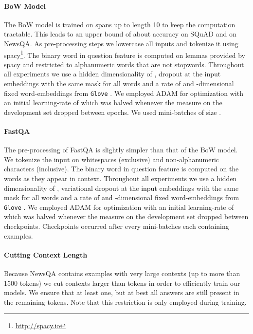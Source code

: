 \documentclass[11pt,a4paper]{article}
\begin{document}
\paragraph{BoW Model}

The BoW model is trained on spans up to length 10 to keep the computation tractable. This leads to an upper bound of about  accuracy on SQuAD and  on NewsQA. As pre-processing steps we lowercase all inputs and tokenize it using spacy\footnote{\url{http://spacy.io}}. The binary word in question feature is computed on lemmas provided by spacy and restricted to alphanumeric words that are not stopwords.
Throughout all experiments we use a hidden dimensionality of , dropout at the input embeddings with the same mask for all words \cite{Gal2015} and a rate of  and -dimensional fixed word-embeddings from \verb|Glove| \cite{Pennington2014}. We employed ADAM \cite{Kingma2015} for optimization with an initial learning-rate of  which was halved whenever the  measure on the development set dropped between epochs. We used mini-batches of size .

\paragraph{FastQA}

The pre-processing of FastQA is slightly simpler than that of the BoW model. We tokenize the input on whitespaces (exclusive) and non-alphanumeric characters (inclusive). The binary word in question feature is computed on the words as they appear in context.
Throughout all experiments we use a hidden dimensionality of , variational dropout at the input embeddings with the same mask for all words \cite{Gal2015} and a rate of  and -dimensional fixed word-embeddings from \verb|Glove| \cite{Pennington2014}. We employed ADAM \cite{Kingma2015} for optimization with an initial learning-rate of  which was halved whenever the  measure on the development set dropped between checkpoints. Checkpoints occurred after every  mini-batches each containing  examples.

\paragraph{Cutting Context Length}

Because NewsQA contains examples with very large contexts (up to more than 1500 tokens) we cut contexts larger than  tokens in order to efficiently train our models. We ensure that at least one, but at best all answers are still present in the remaining  tokens. Note that this restriction is only employed during training.
\end{document}
